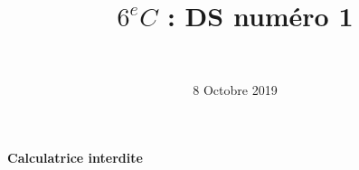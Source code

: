 \documentclass[a4paper,11pt]{exam}
\author{\ }
\date{8 Octobre 2019}
\title{$6^e C$ : DS num\'ero 1}
\begin{document}
%	

	\maketitle
	
\begin{center}
	\textbf{Calculatrice interdite}
\end{center}


	
	
	












\label{LastPage}

%
\end{document}
